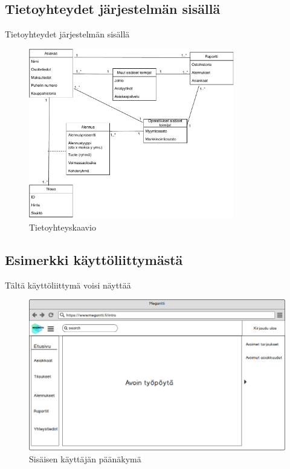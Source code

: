 \documentclass{beamer}
\begin{document}
\subsection{Tietoyhteydet järjestelmän sisällä}

\begin{frame}{Tietoyhteydet järjestelmän sisällä}


	\begin{figure}[h]
		\includegraphics[width=0.8\textwidth]{../harjoitustyo/images/Tietoyhteyskaavio.pdf}
		\caption{Tietoyhteyskaavio}
	\end{figure}

\end{frame}


\subsection{Esimerkki käyttöliittymästä}

\begin{frame}{Tältä käyttöliittymä voisi näyttää}

	\begin{figure}[h]
		\includegraphics[width=\textwidth]{../harjoitustyo/images/gui/sisainen_paa.png}
		\caption{Sisäisen käyttäjän päänäkymä}
	\end{figure}

\end{frame}
\end{document}
